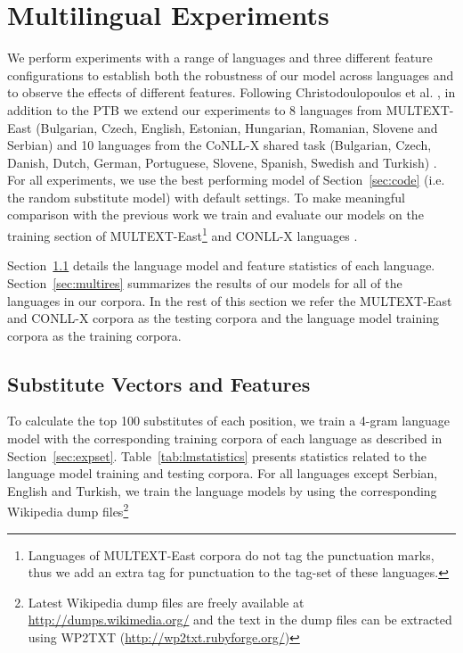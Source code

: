 \section{Multilingual Experiments}
\label{sec:multilang}
\noindent We perform experiments with a range of languages and three
different feature configurations to establish both the robustness of
our model across languages and to observe the effects of different
features.  Following Christodoulopoulos et
al. , in
addition to the PTB we extend our experiments to 8 languages from
MULTEXT-East (Bulgarian, Czech, English, Estonian, Hungarian,
Romanian, Slovene and Serbian) \cite{citeulike:5820223} and 10
languages from the CoNLL-X shared task (Bulgarian, Czech, Danish,
Dutch, German, Portuguese, Slovene, Spanish, Swedish and Turkish)
\cite{Buchholz:2006:CST:1596276.1596305}.  For all experiments, we use
the best performing model of Section~\ref{sec:code} (i.e. the random
substitute model) with default settings.  To make meaningful
comparison with the previous work we train and evaluate our models on
the training section of MULTEXT-East\footnote{Languages of
  MULTEXT-East corpora do not tag the punctuation marks, thus we add
  an extra tag for punctuation to the tag-set of these languages.} and
CONLL-X languages \cite{Lee:2010:STU:1870658.1870741}.

Section~\ref{sec:multivecfeat} details the language model and feature
statistics of each language.  Section~\ref{sec:multires} summarizes
the results of our models for all of the languages in our corpora.  In
the rest of this section we refer the MULTEXT-East and CONLL-X corpora
as the testing corpora and the language model training corpora as
the training corpora.

\subsection{Substitute Vectors and Features}
\label{sec:multivecfeat}
 
To calculate the top 100 substitutes of each position, we train a
4-gram language model with the corresponding training corpora of each
language as described in Section~\ref{sec:expset}.
Table~\ref{tab:lmstatistics} presents statistics related to the
language model training and testing corpora.  For all languages
except Serbian, English and Turkish, we train the language models by
using the corresponding Wikipedia dump files\footnote{Latest Wikipedia
  dump files are freely available at \url{http://dumps.wikimedia.org/}
  and the text in the dump files can be extracted using WP2TXT
  (\url{http://wp2txt.rubyforge.org/})}

